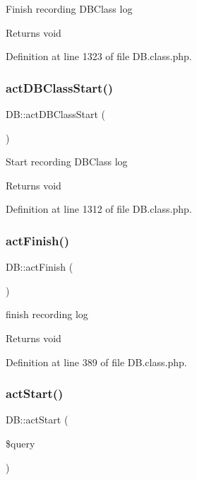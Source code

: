 Finish recording D\+B\+Class log \begin{DoxyReturn}{Returns}
void 
\end{DoxyReturn}


Definition at line 1323 of file D\+B.\+class.\+php.

\hypertarget{classDB_a5aa10d0d5f40cbd7c9b20a84b1c1c307}{}\label{classDB_a5aa10d0d5f40cbd7c9b20a84b1c1c307} 
\subsubsection{\texorpdfstring{act\+D\+B\+Class\+Start()}{actDBClassStart()}}
{\footnotesize\ttfamily D\+B\+::act\+D\+B\+Class\+Start (\begin{DoxyParamCaption}{ }\end{DoxyParamCaption})}

Start recording D\+B\+Class log \begin{DoxyReturn}{Returns}
void 
\end{DoxyReturn}


Definition at line 1312 of file D\+B.\+class.\+php.

\hypertarget{classDB_a79cad647912ef780e967819e6346a742}{}\label{classDB_a79cad647912ef780e967819e6346a742} 
\subsubsection{\texorpdfstring{act\+Finish()}{actFinish()}}
{\footnotesize\ttfamily D\+B\+::act\+Finish (\begin{DoxyParamCaption}{ }\end{DoxyParamCaption})}

finish recording log \begin{DoxyReturn}{Returns}
void 
\end{DoxyReturn}


Definition at line 389 of file D\+B.\+class.\+php.

\hypertarget{classDB_a51a1ba94763a8211495eac18d74c80bb}{}\label{classDB_a51a1ba94763a8211495eac18d74c80bb} 
\subsubsection{\texorpdfstring{act\+Start()}{actStart()}}
{\footnotesize\ttfamily D\+B\+::act\+Start (\begin{DoxyParamCaption}\item[{}]{\$query }\end{DoxyParamCaption})}

